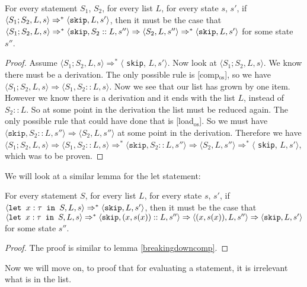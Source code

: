 \begin{lemma}
\label{breakingdowncomp}
For every statement $S_1$, $S_2$, for every list $L$, for every state $s$, $s'$, if $\langle S_1; S_2, L, s \rangle \Rightarrow ^{*} \langle \texttt{skip}, L, s' \rangle$, then it must be the case that $\langle S_1;S_2, L, s \rangle \Rightarrow ^{*} \langle \texttt{skip}, S_2::L, s'' \rangle \Rightarrow \langle S_2, L, s'' \rangle \Rightarrow ^{*} \langle \texttt{skip}, L, s' \rangle$ for some state $s''$. 
\end{lemma}

\begin{proof}
Assume $\langle S_1; S_2, L, s \rangle \Rightarrow ^{*} \langle$ \texttt{skip}, $L, s' \rangle$. Now look at $\langle S_1; S_2, L, s \rangle$. We know there must be a derivation. The only possible rule is [comp$_{\textrm{os}}$], so we have $\langle S_1; S_2, L, s \rangle \Rightarrow \langle S_1, S_2::L, s \rangle$. Now we see that our list has grown by one item. However we know there is a derivation and it ends with the list $L$, instead of $S_2::L$. So at some point in the derivation the list must be reduced again. The only possible rule that could have done that is [load$_{\textrm{os}}$]. So we must have $\langle \texttt{skip} , S_2::L, s'' \rangle \Rightarrow \langle S_2, L, s'' \rangle$ at some point in the derivation. Therefore we have $\langle S_1; S_2, L, s \rangle \Rightarrow \langle S_1, S_2::L, s \rangle \Rightarrow ^{*} \langle \texttt{skip} , S_2::L, s'' \rangle \Rightarrow \langle S_2, L, s'' \rangle \Rightarrow ^{*} \langle$ \texttt{skip}, $L, s' \rangle$, which was to be proven.
\end{proof}

We will look at a similar lemma for the let statement:

\begin{lemma}
\label{breakingdownlet}
For every statement $S$, for every list $L$, for every state $s$, $s'$, if $\langle \texttt{let }x : \tau \texttt{ in } S, L, s \rangle \Rightarrow ^{*} \langle \texttt{skip}, L, s' \rangle$, then it must be the case that $\langle \texttt{let }x : \tau \texttt{ in } S, L, s \rangle \Rightarrow ^{*} \langle \texttt{skip}, (x,s(x))::L, s'' \rangle \Rightarrow \langle (x,s(x)), L, s'' \rangle \Rightarrow \langle \texttt{skip}, L, s' \rangle$ for some state $s''$. 
\end{lemma}

\begin{proof}
The proof is similar to lemma \ref{breakingdowncomp}. 
\end{proof}

Now we will move on, to proof that for evaluating a statement, it is irrelevant what is in the list. 


